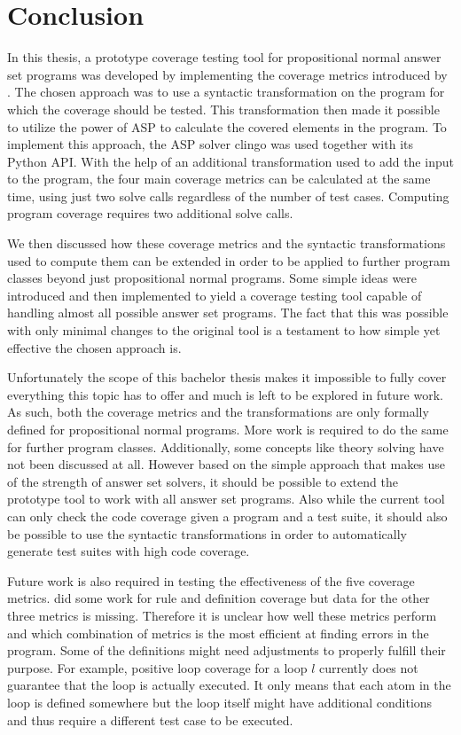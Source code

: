 \chapter{Conclusion}
\label{ch:Conclusion}
In this thesis, a prototype coverage testing tool for propositional normal answer set programs was developed by implementing the coverage metrics introduced by \textcite{Jan+10}. The chosen approach was to use a syntactic transformation on the program for which the coverage should be tested. This transformation then made it possible to utilize the power of ASP to calculate the covered elements in the program. To implement this approach, the ASP solver clingo was used together with its Python API. With the help of an additional transformation used to add the input to the program, the four main coverage metrics can be calculated at the same time, using just two solve calls regardless of the number of test cases. Computing program coverage requires two additional solve calls.

We then discussed how these coverage metrics and the syntactic transformations used to compute them can be extended in order to be applied to further program classes beyond just propositional normal programs. Some simple ideas were introduced and then implemented to yield a coverage testing tool capable of handling almost all possible answer set programs. The fact that this was possible with only minimal changes to the original tool is a testament to how simple yet effective the chosen approach is.

Unfortunately the scope of this bachelor thesis makes it impossible to fully cover everything this topic has to offer and much is left to be explored in future work. As such, both the coverage metrics and the transformations are only formally defined for propositional normal programs. More work is required to do the same for further program classes. Additionally, some concepts like theory solving have not been discussed at all. However based on the simple approach that makes use of the strength of answer set solvers, it should be possible to extend the prototype tool to work with all answer set programs. Also while the current tool can only check the code coverage given a program and a test suite, it should also be possible to use the syntactic transformations in order to automatically generate test suites with high code coverage.

Future work is also required in testing the effectiveness of the five coverage metrics. \textcite{Jan+11} did some work for rule and definition coverage but data for the other three metrics is missing. Therefore it is unclear how well these metrics perform and which combination of metrics is the most efficient at finding errors in the program. Some of the definitions might need adjustments to properly fulfill their purpose. For example, positive loop coverage for a loop $l$ currently does not guarantee that the loop is actually executed. It only means that each atom in the loop is defined somewhere but the loop itself might have additional conditions and thus require a different test case to be executed.

